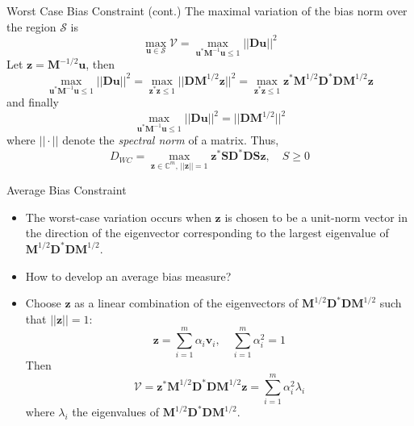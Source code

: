 \documentclass{beamer}
\begin{document}
\begin{frame}{Worst Case Bias Constraint (cont.)}
The maximal variation of the bias norm over the region $\mathcal{S}$ is
\[
\max_{\mathbf{u} \in \mathcal{S}} \mathcal{V} = 
\max_{\mathbf{u}^*\mathbf{M}^{-1}\mathbf{u} \leq 1} ||\mathbf{D u}||^2
\]
Let $\mathbf{z} = \mathbf{M}^{-1/2}\mathbf{u}$, then
\[
\max_{\mathbf{u}^*\mathbf{M}^{-1}\mathbf{u} \leq 1} ||\mathbf{D u}||^2 = 
\max_{\mathbf{z}^*\mathbf{z} \leq 1} ||\mathbf{D} \mathbf{M}^{1/2}\mathbf{z}||^2 = 
\max_{\mathbf{z}^*\mathbf{z} \leq 1} \mathbf{z}^* \mathbf{M}^{1/2} \mathbf{D}^* \mathbf{D} 
\mathbf{M}^{1/2} \mathbf{z}
\]
and finally
\[
\max_{\mathbf{u}^*\mathbf{M}^{-1}\mathbf{u} \leq 1} ||\mathbf{D u}||^2 = 
||\mathbf{D} \mathbf{M}^{1/2}||^2
\]
where $|| \cdot ||$ denote the \textit{spectral norm} of a matrix. Thus,
\[
D_{WC} = 
\max_{\mathbf{z} \in \mathbb{C}^m, \, ||\mathbf{z}|| = 1} \mathbf{z}^* \mathbf{S} \mathbf{D}^* \mathbf{D} 
\mathbf{S} \mathbf{z}, \quad S \geq 0
\]
\end{frame}

\begin{frame}{Average Bias Constraint}
\begin{itemize}
    \item The worst-case variation occurs when $\mathbf{z}$ is chosen to be a unit-norm vector in the direction
    of the eigenvector corresponding to the largest eigenvalue of 
    $\mathbf{M}^{1/2} \mathbf{D}^* \mathbf{D} \mathbf{M}^{1/2}$.
    \item How to develop an average bias measure?
    \item Choose $\mathbf{z}$ as a linear combination of the eigenvectors of 
    $\mathbf{M}^{1/2} \mathbf{D}^* \mathbf{D} \mathbf{M}^{1/2}$ such that 
    $||\mathbf{z}||=1$:
    \[
        \mathbf{z} = \sum_{i=1}^m \alpha_i \mathbf{v}_i, \quad \sum_{i=1}^m \alpha_i^2 = 1
    \]
    Then
    \[
        \mathcal{V} = \mathbf{z}^* \mathbf{M}^{1/2} \mathbf{D}^* \mathbf{D} \mathbf{M}^{1/2} \mathbf{z} =
        \sum_{i=1}^m \alpha_i^2 \lambda_i
    \]
    where $\lambda_i$ the eigenvalues of $\mathbf{M}^{1/2} \mathbf{D}^* \mathbf{D} \mathbf{M}^{1/2}$.
\end{itemize}
\end{frame}
\end{document}
